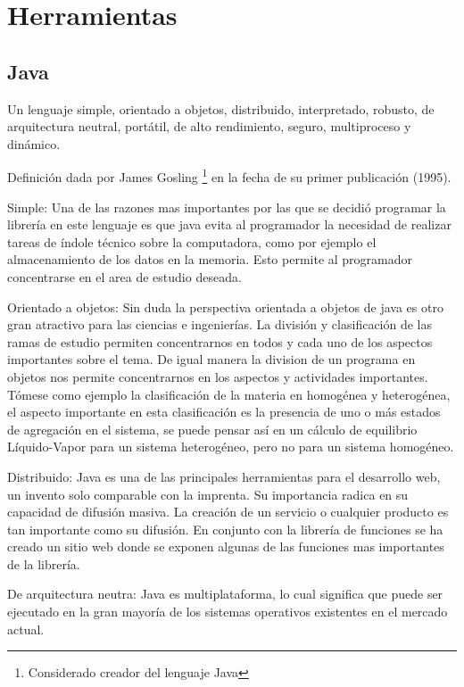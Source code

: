 \chapter{Herramientas}
	\section{Java}
		Un lenguaje simple, orientado a objetos, distribuido, interpretado, robusto, de arquitectura neutral, portátil, de alto rendimiento, seguro, multiproceso y dinámico.\cite{java} 

		Definición dada por James Gosling \footnote{Considerado creador del lenguaje Java}  en la fecha de su primer publicación (1995). 

		\begin{description}
		\item{Simple:} Una de las razones mas importantes por las que se decidió programar la librería en este lenguaje es que java evita al programador la necesidad de realizar tareas de índole técnico sobre la computadora, como por ejemplo el almacenamiento de los datos en la memoria. Esto permite al programador concentrarse en el area de estudio deseada.

		\item{Orientado a objetos:}
		Sin duda la perspectiva orientada a objetos de java es otro gran atractivo para las ciencias e ingenierías. La división y clasificación de las ramas de estudio permiten concentrarnos en todos y cada uno de los aspectos importantes sobre el tema. De igual manera la division de un programa en objetos nos permite concentrarnos en los aspectos y actividades importantes. Tómese como ejemplo la clasificación de la materia en homogénea y heterogénea, el aspecto importante en esta clasificación es la presencia de uno o más estados de agregación en el sistema, se puede pensar así en un cálculo de equilibrio Líquido-Vapor para un sistema heterogéneo, pero no para un sistema homogéneo.

		\item{Distribuido:}
		Java es una de las principales herramientas para el desarrollo web, un invento solo comparable con la imprenta. Su importancia radica en su capacidad de difusión masiva. La creación de un servicio o cualquier producto es tan importante como su difusión. En conjunto con la librería de funciones se ha creado un sitio web donde se exponen algunas de las funciones mas importantes de la librería.

		\item{De arquitectura neutra:}
		Java es multiplataforma, lo cual significa que puede ser ejecutado en la gran mayoría de los sistemas operativos existentes en el mercado actual.

		\end{description}

